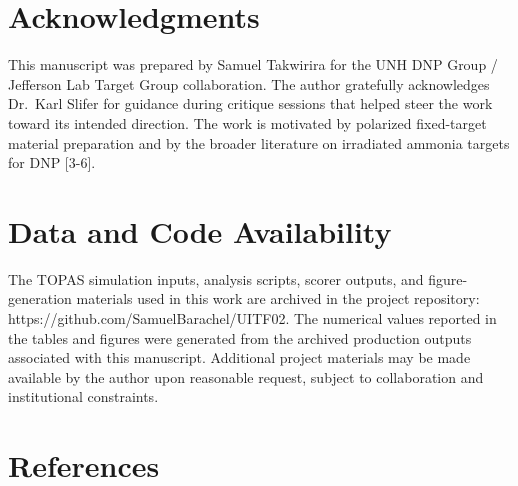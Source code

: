 \documentclass[
  12pt,
]{article}
\begin{document}
\hypertarget{acknowledgments}{%
\section{Acknowledgments}\label{acknowledgments}}

This manuscript was prepared by Samuel Takwirira for the UNH DNP Group /
Jefferson Lab Target Group collaboration. The author gratefully
acknowledges Dr.~Karl Slifer for guidance during critique sessions that
helped steer the work toward its intended direction. The work is
motivated by polarized fixed-target material preparation and by the
broader literature on irradiated ammonia targets for DNP {[}3-6{]}.

\hypertarget{data-and-code-availability}{%
\section{Data and Code Availability}\label{data-and-code-availability}}

The TOPAS simulation inputs, analysis scripts, scorer outputs, and
figure-generation materials used in this work are archived in the
project repository: https://github.com/SamuelBarachel/UITF02. The
numerical values reported in the tables and figures were generated from
the archived production outputs associated with this manuscript.
Additional project materials may be made available by the author upon
reasonable request, subject to collaboration and institutional
constraints.

\hypertarget{references}{%
\section{References}\label{references}}
\end{document}
